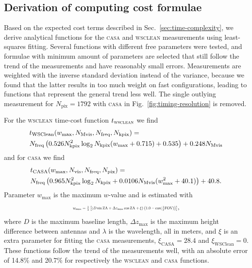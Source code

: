 \documentclass[useAMS,usenatbib]{mn2e}
\begin{document}

\subsection{Derivation of computing cost formulae}
Based on the expected cost terms described in Sec.~\ref{sec:time-complexity}, we derive analytical functions for the \textsc{casa} and \textsc{wsclean} measurements using least-squares fitting. Several functions with different free parameters were tested, and formulae with minimum amount of parameters are selected that still follow the trend of the measurements and have reasonably small errors. Measurements are weighted with the inverse standard deviation instead of the variance, because we found that the latter results in too much weight on fast configurations, leading to functions that represent the general trend less well. The single outlying measurement for $N_\textrm{pix}=1792$ with \textsc{casa} in Fig.~\ref{fig:timing-resolution} is removed.

For the \textsc{wsclean} time-cost function $t_\textrm{\textsc{wsclean}}$ we find 
\begin{align}\label{eq:wsclean-computing-cost}
& t_\textrm{WSClean} (w_{\max},N_\textrm{Mvis},N_\textrm{freq},N_\textrm{kpix}) = \\ \notag%
& N_\textrm{freq} \left( 0.526 N_\textrm{kpix}^2 \log_2 N_\textrm{kpix} (w_{\max} + 0.715) + 0.535 \right) + 0.248 N_\textrm{Mvis}
\end{align}
and for \textsc{casa} we find
\begin{align}\label{eq:casa-computing-cost}
& t_\textrm{CASA}(w_{\max},N_\textrm{vis},N_\textrm{freq},N_\textrm{pix}) = \\ \notag%
& N_\textrm{freq} \left(0.965 N_\textrm{kpix}^2 \log_2 N_\textrm{kpix} + 0.0106 N_\textrm{Mvis} (w_{\max}^2 + 40.1)\right) + 40.8.
\label{eq:casa-computing-cost}%
\end{align}
Parameter $w_{\max}$ is the maximum $w$-value and is estimated with
\begin{equation}\resizebox{0.45\textwidth}{!}{$
 w_{\max} = \frac{1}{\lambda}\left[(D \sin \textrm{ZA} + \Delta z_{\max} \cos \textrm{ZA} + \xi) \left(1.0 - \cos(\frac{1}{2}\textrm{FOV})\right)\right]$},
\end{equation}%
where $D$ is the maximum baseline length, $\Delta z_{\max}$ is the maximum height difference between antennas and $\lambda$ is the wavelength, all in meters, and $\xi$ is an extra parameter for fitting the \textsc{casa} measurements, $\xi_\textrm{CASA}=28.4$ and $\xi_\textrm{WSClean}=0$. These functions follow the trend of the measurements well, with an absolute error of 14.8\% and 20.7\% for respectively the \textsc{wsclean} and \textsc{casa} functions.
\end{document}
